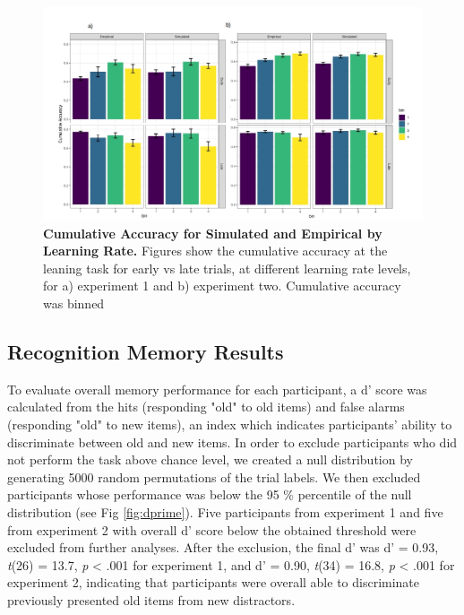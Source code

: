 \documentclass[a4paper,12pt]{article}
\begin{document}
\begin{figure}[ht!]
\centerline
{\includegraphics[width=1.5\textwidth]{figures/bin.plot.all.jpg}}
\caption{\textbf{Cumulative Accuracy for Simulated and Empirical by Learning Rate.} Figures show the cumulative accuracy at the leaning task for early vs late trials, at different learning rate levels, for a) experiment 1 and b) experiment two. Cumulative accuracy was binned  }
\label{fig:binAll}
\end{figure}

\subsection{Recognition Memory Results}
To evaluate overall memory performance for each participant, a d' score was calculated from the hits (responding "old" to old items) and false alarms (responding "old" to new items), an index which indicates participants' ability to discriminate between old and new items. In order to exclude participants who did not perform the task above chance level, we created a null distribution by generating 5000 random permutations of the trial labels. We then excluded participants whose performance was below the 95 \% percentile of the null distribution (see Fig \ref{fig:dprime}). Five participants from experiment 1 and five from experiment 2 with overall d' score below the obtained threshold were excluded from further analyses. After the exclusion, the final d' was d' = 0.93,  \textit{t}(26) = 13.7, \textit{p} < .001 for experiment 1, and d’ = 0.90,  \textit{t}(34) = 16.8, \textit{p} < .001 for experiment 2, indicating that participants were overall able to discriminate previously presented old items from new distractors. \par
\end{document}

